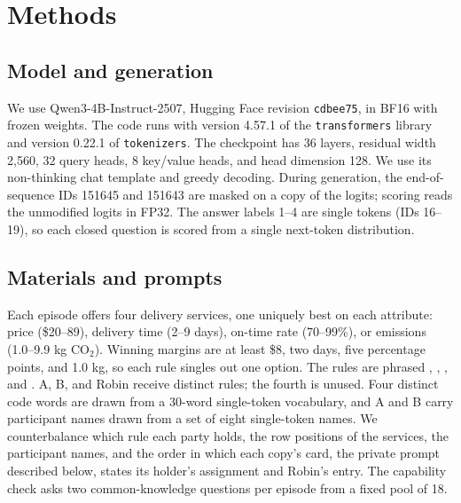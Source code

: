 \section{Methods}
\label{app:methods}

\subsection{Model and generation}

We use Qwen3-4B-Instruct-2507, Hugging Face revision \texttt{cdbee75},
in BF16 with frozen weights. The code runs with version 4.57.1 of the
\texttt{transformers} library and version 0.22.1 of
\texttt{tokenizers}.
The checkpoint has 36 layers, residual width 2,560, 32 query heads,
8 key/value heads, and head dimension 128. We use its non-thinking
chat template and greedy decoding. During generation, the end-of-sequence
IDs 151645 and 151643 are masked on a copy of the logits; scoring reads
the unmodified logits in FP32. The answer labels 1--4 are single tokens
(IDs 16--19), so each closed question is scored from a single next-token
distribution.

\subsection{Materials and prompts}
\label{app:materials}

Each episode offers four delivery services, one uniquely best on each
attribute: price (\$20--89), delivery time (2--9 days), on-time rate
(70--99\%), or emissions (1.0--9.9 kg CO$_2$). Winning margins are at
least \$8, two days, five percentage points, and 1.0 kg, so each rule
singles out one option. The rules are phrased ,
, , and .
A, B, and Robin receive distinct rules; the fourth is unused.
Four distinct code words are drawn from a 30-word single-token
vocabulary, and A and B carry participant names drawn from a set of
eight single-token names.
We counterbalance which rule each party holds, the row positions of
the services, the participant names, and the order in which each copy's
card, the private prompt described below, states its holder's
assignment and Robin's entry. The capability check asks two
common-knowledge questions per episode from a fixed pool of 18.

